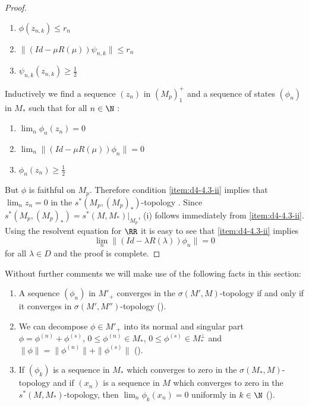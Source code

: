 \begin{proof}
\begin{enumerate}[label=(\roman*$^{\prime}$)]
\item
$ \phi(z_{n,k}) \leq r_{n} $ 

\item
$ \|(Id - \mu R(\mu))\psi_{n,k}\| \leq r_{n} $ 

\item
$ \psi_{n,k}(z_{n,k}) \geq \frac{1}{2} $ 
\end{enumerate}
Inductively we find a sequence $ (z_{n}) $  in $ (M_{p})_{1}^{+} $  and a sequence of states $ (\phi_{n}) $  in $ M_{*} $  such that for all $ n \in \N $ :
\begin{enumerate}[label=(\roman*$^{\prime\prime}$)]
\item
$ \lim_{n} \phi_{n}(z_{n}) = 0 $ 

\item\label{item:d4-4.3-ii}
$ \lim_{n} \|(Id - \mu R(\mu))\phi_{n}\| = 0 $ 

\item
$ \phi_{n}(z_{n}) \geq \frac{1}{2} $ 
\end{enumerate}
But $ \phi $  is faithful on $ M_{p} $.
Therefore condition \ref{item:d4-4.3-ii} implies that $ \lim_{n} z_{n} = 0 $  in the $ s^{*}(M_{p},(M_{p})_{*}) $-topology \citet[Proposition III.5.4]{takesaki:1979}.
Since $ s^{*}(M_{p},(M_{p})_{*}) = s^{*}(M,M_{*})|_{M_{p}} $, (i) follows immediately from \ref{item:d4-4.3-ii}.
Using the resolvent equation for $ \RR $  it is easy to see that \ref{item:d4-4.3-ii} implies
\[
\lim_{n} \|(Id - \lambda R(\lambda))\phi_{n}\| = 0
\]
for all $ \lambda \in D $  and the proof is complete.
\end{proof}
Without further comments we will make use of the following facts in this section:
\begin{enumerate}[(1)]
\item
A sequence $ (\phi_{n}) $  in $ M'_{+} $  converges in the $ \sigma(M',M) $-topology if and only if it converges in $ \sigma(M',M'') $-topology (\citet{akemandoddsgamlen:1972}).

\item
We can decompose $ \phi \in M'_{+} $  into its normal and singular part $ \phi = \phi^{(n)} + \phi^{(s)} $, $ 0 \leq \phi^{(n)} \in M_{*} $, $ 0 \leq \phi^{(s)} \in M_*^{\perp} $  and $ \|\phi\| = \|\phi^{(n)}\| + \|\phi^{(s)}\| $  (\citet[Theorem III.2.14]{takesaki:1979}).

\item
If $ (\phi_{k}) $  is a sequence in $ M_{*} $  which converges to zero in the $ \sigma(M_{*},M) $-topology and if $ (x_{n}) $  is a sequence in $ M $  which converges to zero in the $ s^{*}(M,M_{*}) $-topology, then $ \lim_{n} \phi_{k}(x_{n}) = 0 $  uniformly in $ k \in \N $  (\citet[Lemma III.5.5]{takesaki:1979}).
\end{enumerate}
